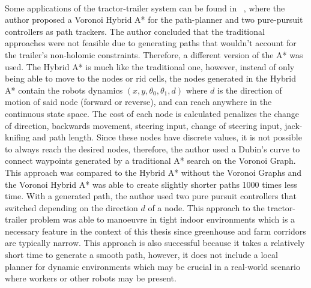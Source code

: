 \paragraph{}Some applications of the tractor-trailer system can be found in ~\cite{theman}, 
where the author proposed a Voronoi Hybrid A* for the path-planner and two pure-pursuit controllers 
as path trackers. The author concluded that the traditional approaches were not feasible due 
to generating paths that wouldn't account for the trailer's non-holomic constraints. Therefore, 
a different version of the A* was used. The Hybrid A* is much like the traditional one, however, 
instead of only being able to move to the nodes or rid cells, the nodes generated in the Hybrid A* 
contain the robots dynamics $(x,y,\theta_0,\theta_1,d)$ where $d$ is the direction of motion of said 
node (forward or reverse), and can reach anywhere in the continuous state space. The cost of each 
node is calculated penalizes the change of direction, backwards movement, steering input, change of 
steering input, jack-knifing and path length. Since these nodes have discrete values, it is not 
possible to always reach the desired nodes, therefore, the author used a Dubin's curve to connect 
waypoints generated by a traditional A* search on the Voronoi Graph. This approach was compared to the Hybrid A* without 
the Voronoi Graphs and the Voronoi Hybrid A* was able to create slightly shorter paths 1000 times 
less time. With a generated path, the author used two pure pursuit controllers that switched depending on the 
direction $d$ of a node. This approach to the tractor-trailer problem was able to manoeuvre in 
tight indoor environments which is a necessary feature in the context of this thesis since greenhouse 
and farm corridors are typically narrow. This approach is also successful because it takes a relatively 
short time to generate a smooth path, however, it does not include a local planner for dynamic environments which 
may be crucial in a real-world scenario where workers or other robots may be present.

